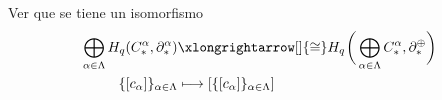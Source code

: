 \begin{ejercicio}
Ver que se tiene un isomorfismo
\begin{align*}
    \bigoplus_{\alpha \in \Lambda} H_q(C_*^\alpha, \partial_*^\alpha)&\xlongrightarrow[]{\cong} H_q\hspace{0.2mm}\bigg(\displaystyle\bigoplus_{\alpha \in \Lambda} C_*^\alpha, \partial_*^\oplus\bigg)\\
    \{[c_\alpha]\}_{\alpha \in \Lambda}&\longmapsto [\{[c_\alpha]\}_{\alpha \in \Lambda}]
\end{align*}
\end{ejercicio}

\begin{demostracion}

\end{demostracion}
